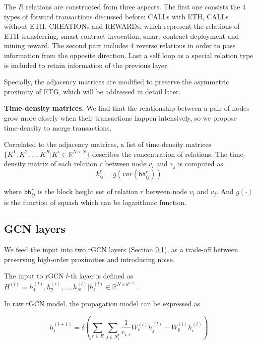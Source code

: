 The $R$ relations are constructed from three aspects. The first one consists the 4 types of forward transactions discussed before: CALLs with ETH, CALLs without ETH, CREATIONs and REWARDs, which represent the relations of ETH transferring, smart contract invocation, smart contract deployment and mining reward. The second part includes 4 reverse relations in order to pass information from the opposite direction. Last a self loop as a special relation type is included to retain information of the previous layer.

Specially, the adjacency matrices are modified to preserve the asymmetric proximity of ETG, which will be addressed in detail later. 




\textbf{Time-density matrices.} We find that the relationship between a pair of nodes grow more closely when their transactions happen intensively, so we propose time-density to merge transactions.

 Correlated to the adjacency matrices, a list of time-density matrices $\{K^1,K^2,...,K^R|K^i\in \mathbb{R}^{N \times N}\}$ describes the concentration of relations. The time-density matrix of each relation $r$ between node $v_i$ and $v_j$ is computed as%
\begin{equation}
k_{ij}^r=g(var(\texttt{bh}_{ij}^r))
\label{eq:time}
\end{equation}

\noindent where $\texttt{bh}_{ij}^{r}$ is the block height set of relation $r$ between node $v_i$ and $v_j$. And $g(\cdot)$ is the function of squash which can be logarithmic function.


\subsection{GCN layers}
\label{sec:rGCN layers}
 We feed the input into two rGCN layers (Section \ref{sec:rGCN layers}), as a trade-off between preserving high-order proximities and introducing noise.

The input to rGCN $l$-th layer is defined as $H^{(l)}={h_1^{(l)},h_2^{(l)},...,h_N^{(l)}|h_i^{(l)}\in \mathbb{R}^{N \times d^{(l)}}}$.

In raw rGCN model, the propagation model can be expressed as

\begin{equation}
h_i^{(l+1)}=\delta(\sum_{r\in R} \sum_{j \in N_i^r} \frac{1}{c_{i,r}}W_r^{(l)}h_j^{(l)}+W_0^{(l)}h_i^{(l)})
\label{eq:rgcn}
\end{equation}

